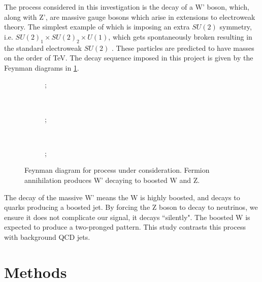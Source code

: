 \documentclass{report}
\begin{document}
The process considered in this investigation is the decay of a W' boson, which, along with Z', are massive gauge bosons which arise in extensions to electroweak theory. The simplest example of which is imposing an extra $SU(2)$ symmetry, i.e. $SU(2)_1 \times SU(2)_2 \times U(1)$, which gets spontaneously broken resulting in the standard electroweak $SU(2)$ \cite{pdg2012}. These particles are predicted to have masses on the order of \si{\tera\electronvolt}. The decay sequence imposed in this project is given by the Feynman diagrams in \cref{fig:feynmans}.


	\begin{figure}[H]
		\centering
		\begin{subfigure}[t]{0.3\linewidth}
			\centering
			;
		\end{subfigure}%
		~ 
		\begin{subfigure}[t]{0.3\linewidth}
			\centering
			;
		\end{subfigure}
		~
		\begin{subfigure}[t]{0.3\linewidth}
			\centering
			;
		\end{subfigure}
	\caption{Feynman diagram for process under consideration. Fermion annihilation produces W' decaying to boosted W and Z.}
	\label{fig:feynmans}
	\end{figure}

The decay of the massive W' means the W is highly boosted, and decays to quarks producing a boosted jet. By forcing the Z boson to decay to neutrinos, we ensure it does not complicate our signal, it decays ``silently". The boosted W is expected to produce a two-pronged pattern. This study contrasts this process with background QCD jets.
 





\chapter{Methods}
\label{sec:methods}
\end{document}
